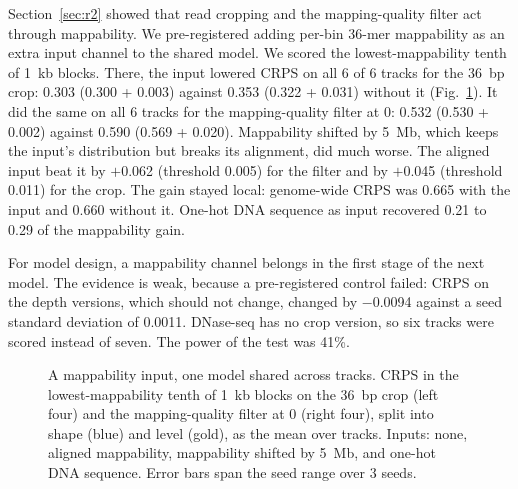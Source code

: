 \documentclass[pdflatex,sn-mathphys-num]{sn-jnl}
\newcommand{\lit}[1]{#1}
\newcommand{\dnaShareHi}{0.29}
\newcommand{\dnaShareLo}{0.21}
\newcommand{\gAl}{0.660}
\newcommand{\gMap}{0.665}
\newcommand{\mAlL}{0.353}
\newcommand{\mAlLOS}{0.322}
\newcommand{\mAlLSE}{0.031}
\newcommand{\mAlQ}{0.590}
\newcommand{\mAlQOS}{0.569}
\newcommand{\mAlQSE}{0.020}
\newcommand{\mDepthChg}{\ensuremath{-}0.0094}
\newcommand{\mDepthSD}{0.0011}
\newcommand{\mMapL}{0.303}
\newcommand{\mMapLOS}{0.300}
\newcommand{\mMapLSE}{0.003}
\newcommand{\mMapQ}{0.532}
\newcommand{\mMapQOS}{0.530}
\newcommand{\mMapQSE}{0.002}
\newcommand{\nMapLPass}{6}
\newcommand{\nMapQPass}{6}
\newcommand{\nMapTracks}{6}
\newcommand{\powMap}{41}
\newcommand{\sMapL}{\ensuremath{+}0.045}
\newcommand{\sMapLBar}{0.011}
\newcommand{\sMapQ}{\ensuremath{+}0.062}
\newcommand{\sMapQBar}{0.005}
\begin{document}
Section~\ref{sec:r2} showed that read cropping and the mapping-quality filter act through
mappability. We pre-registered adding per-bin \lit{36}-mer mappability as an extra input channel
to the shared model. We scored the lowest-mappability tenth of \lit{1}~kb blocks. There, the
input lowered CRPS on all \nMapLPass{} of \nMapTracks{} tracks for the \lit{36}~bp crop: \mMapL{}
(\mMapLOS{} + \mMapLSE{}) against \mAlL{} (\mAlLOS{} + \mAlLSE{}) without it
(Fig.~\ref{fig:map}). It did the same on all \nMapQPass{} tracks for the mapping-quality filter at
\lit{0}: \mMapQ{} (\mMapQOS{} + \mMapQSE{}) against \mAlQ{} (\mAlQOS{} + \mAlQSE{}). Mappability
shifted by \lit{5}~Mb, which keeps the input's distribution but breaks its alignment, did much
worse. The aligned input beat it by \sMapQ{} (threshold \sMapQBar{}) for the filter and by
\sMapL{} (threshold \sMapLBar{}) for the crop. The gain stayed local: genome-wide CRPS was
\gMap{} with the input and \gAl{} without it. One-hot DNA sequence as input recovered
\dnaShareLo{} to \dnaShareHi{} of the mappability gain.

For model design, a mappability channel belongs in the first stage of the next model. The
evidence is weak, because a pre-registered control failed: CRPS on the depth versions, which
should not change, changed by \mDepthChg{} against a seed standard deviation of \mDepthSD{}.
DNase-seq has no crop version, so six tracks were scored instead of seven. The power of the
test was \powMap\%.

\begin{figure}[t]
\centering
{}
\caption{A mappability input, one model shared across tracks. CRPS in the lowest-mappability
tenth of \lit{1}~kb blocks on the \lit{36}~bp crop (left four) and the mapping-quality filter
at \lit{0} (right four), split into shape (blue) and level (gold), as the mean over tracks.
Inputs: none, aligned mappability, mappability shifted by \lit{5}~Mb, and one-hot DNA sequence.
Error bars span the seed range over \lit{3} seeds.}\label{fig:map}
\end{figure}
\end{document}
